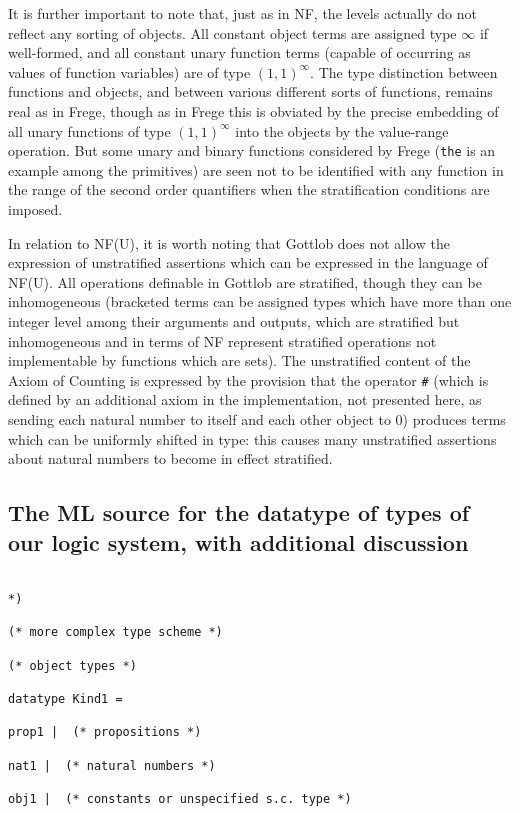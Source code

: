 \documentclass{article}
\begin{document}
{{It is further important to note that, just as in NF, the levels actually do not reflect any sorting of objects.  All constant object terms are assigned type $\infty$ if well-formed,
and all constant unary function terms (capable of occurring as values of function variables) are of type $(1,1)^{\infty}$.  The type distinction between functions and objects, and between various different sorts of functions, remains real as in Frege, though as in Frege this is obviated by the precise embedding of all unary functions of type $(1,1)^{\infty}$ into the objects by the value-range operation.  But some unary and binary functions considered by Frege ({\tt the} is an example among the primitives) are seen not to be identified with any function in the range of the second order quantifiers when the stratification conditions are imposed.

In relation to NF(U), it is worth noting that Gottlob does not allow the expression of unstratified assertions which can be expressed in the language of NF(U).  All operations definable
in Gottlob are stratified, though they can be inhomogeneous (bracketed terms can be assigned types which have more than one integer level among their arguments and outputs, which are stratified but inhomogeneous and in terms of NF represent stratified operations not implementable by functions which are sets).  The unstratified content of the Axiom of Counting is expressed by the provision that the operator {\tt \#} (which is defined by an additional axiom in the implementation, not presented here, as sending each natural number to itself and each other object to 0) produces terms which can be uniformly shifted in type:  this causes many unstratified assertions about natural numbers to become in effect stratified.


\subsection{The ML source for the datatype of types of our logic system, with additional discussion}
\begin{verbatim}

*)

(* more complex type scheme *)

(* object types *)

datatype Kind1 =

prop1 |  (* propositions *)

nat1 |  (* natural numbers *)

obj1 |  (* constants or unspecified s.c. type *)


\end{verbatim}}}
\end{document}
